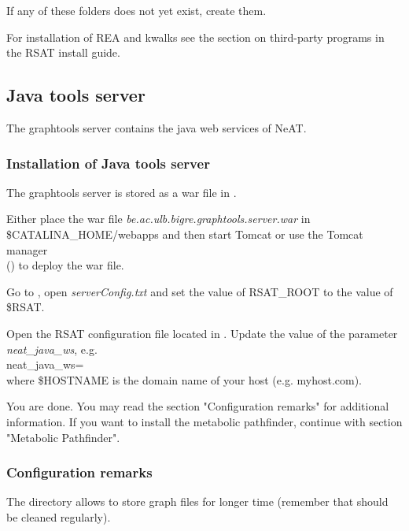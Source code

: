 \documentclass{book}
\begin{document}
If any of these folders does not yet exist, create them.

For installation of REA and kwalks see the section on third-party programs in
the RSAT install guide.

\subsection{Java tools server}

The graphtools server contains the java web services of NeAT.

\subsubsection{Installation of Java tools server}

The graphtools server is stored as a war file in .

Either place the war file \textit{be.ac.ulb.bigre.graphtools.server.war} in
\$CATALINA\_HOME/webapps and then start Tomcat or use the Tomcat manager\\
 ()
 to deploy the war file.

Go to , open
\textit{serverConfig.txt} and set the value of RSAT\_ROOT to the value of \$RSAT.

Open the RSAT configuration file
 located in .
Update the value of the parameter \textit{neat\_java\_ws}, e.g.\\
neat\_java\_ws=\\
where \$HOSTNAME is the domain name of your host (e.g. myhost.com).

You are done. You may read the section "Configuration remarks" for additional information.
If you want to install the metabolic pathfinder, continue with section "Metabolic Pathfinder".

\subsubsection{Configuration remarks}

The directory 
allows to store graph files for longer time
(remember that  should be cleaned regularly).\\
\end{document}
